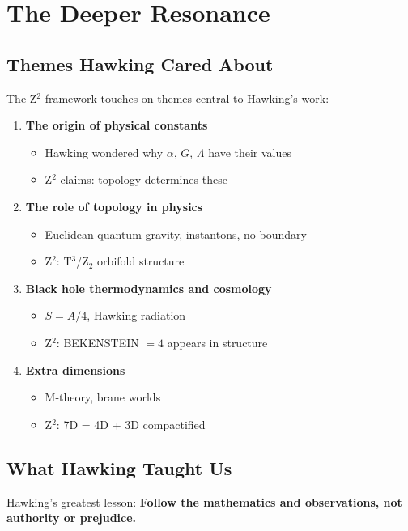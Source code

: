 \documentclass[12pt,a4paper]{article}
\begin{document}
\section{The Deeper Resonance}

\subsection{Themes Hawking Cared About}

The Z$^2$ framework touches on themes central to Hawking's work:

\begin{enumerate}
\item \textbf{The origin of physical constants}
\begin{itemize}
\item Hawking wondered why $\alpha$, $G$, $\Lambda$ have their values
\item Z$^2$ claims: topology determines these
\end{itemize}

\item \textbf{The role of topology in physics}
\begin{itemize}
\item Euclidean quantum gravity, instantons, no-boundary
\item Z$^2$: T$^3$/Z$_2$ orbifold structure
\end{itemize}

\item \textbf{Black hole thermodynamics and cosmology}
\begin{itemize}
\item $S = A/4$, Hawking radiation
\item Z$^2$: BEKENSTEIN $= 4$ appears in structure
\end{itemize}

\item \textbf{Extra dimensions}
\begin{itemize}
\item M-theory, brane worlds
\item Z$^2$: 7D = 4D + 3D compactified
\end{itemize}
\end{enumerate}

\subsection{What Hawking Taught Us}

Hawking's greatest lesson: \textbf{Follow the mathematics and observations, not authority or prejudice.}
\end{document}
